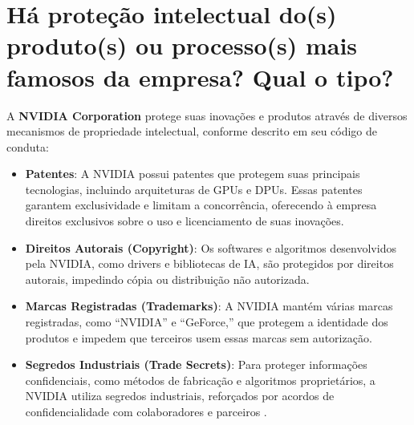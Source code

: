 \section{Há proteção intelectual do(s) produto(s) ou processo(s) mais famosos da empresa? Qual o tipo?}

A \textbf{NVIDIA Corporation} protege suas inovações e produtos através de diversos mecanismos de propriedade intelectual, conforme descrito em seu código de conduta:

\begin{itemize}
    \item \textbf{Patentes}: A NVIDIA possui patentes que protegem suas principais tecnologias, incluindo arquiteturas de GPUs e DPUs. Essas patentes garantem exclusividade e limitam a concorrência, oferecendo à empresa direitos exclusivos sobre o uso e licenciamento de suas inovações.

    \item \textbf{Direitos Autorais (Copyright)}: Os softwares e algoritmos desenvolvidos pela NVIDIA, como drivers e bibliotecas de IA, são protegidos por direitos autorais, impedindo cópia ou distribuição não autorizada.

    \item \textbf{Marcas Registradas (Trademarks)}: A NVIDIA mantém várias marcas registradas, como “NVIDIA” e “GeForce,” que protegem a identidade dos produtos e impedem que terceiros usem essas marcas sem autorização.

    \item \textbf{Segredos Industriais (Trade Secrets)}: Para proteger informações confidenciais, como métodos de fabricação e algoritmos proprietários, a NVIDIA utiliza segredos industriais, reforçados por acordos de confidencialidade com colaboradores e parceiros \cite{nvidia_code_conduct}.
\end{itemize}